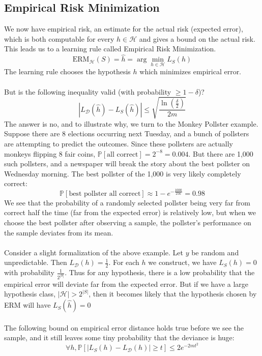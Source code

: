 \documentclass{article}
\newcommand{\p}{\mathbb{P}}
\newcommand{\D}{\mathcal{D}}
\newcommand{\h}{\mathcal{H}}
\begin{document}
\subsection{Empirical Risk Minimization}
  We now have empirical risk, an estimate for the actual risk (expected
  error), which is both computable for every $h \in \h$ and gives a bound on
  the actual risk. This leads us to a learning rule called Empirical Risk
  Minimization.
  $$\text{ERM}_\h(S) = \hat{h} = \arg \min_{h \in \h} L_S(h)$$
  The learning rule chooses the hypothesis $h$ which minimizes empirical error.
  \\
  \\But is the following inequality valid (with probability $\geq 1 - \delta$)?
  $$|L_\D(\hat{h}) - L_S(\hat{h})|\leq
  \sqrt{\frac{\ln \left(\frac{\delta}{2}\right)}{2m}}$$
  The answer is no, and to illustrate why, we turn to the Monkey Pollster
  example. Suppose there are 8 elections occurring next Tuesday, and a bunch of
  pollsters are attempting to predict the outcomes. Since these pollsters are
  actually monkeys flipping 8 fair coins, $\p[\text{all correct}] = 2^{-8}
  = 0.004$. But there are 1,000 such pollsters, and a newspaper will break the
  story about the best pollster on Wednesday morning. The best pollster of the
  1,000 is very likely completely correct:
  $$\p\left[\text{best pollster all correct}\right] \approx 1 -
  e^{- \frac{1000}{256}} = 0.98 $$
  We see that the probability of a randomly selected pollster being very far
  from
  correct half the time (far from the expected error) is relatively low, but
  when we choose the best pollster after observing a sample, the pollster's
  performance on the sample deviates from its mean.
  \\
  \\Consider a slight formalization of the above example. Let $y$ be random and
  unpredictable. Then $L_\D(h) = \frac{1}{2}$. For each $h$ we construct, we
  have $L_S(h) = 0$ with probability $\frac{1}{2^{|S|}}$. Thus for any
  hypothesis, there is a low probability that the empirical error will deviate
  far from the expected error. But if we have a large hypothesis class,
  $|\h|>2^{|S|}$, then it becomes likely that the hypothesis chosen by ERM
  will have $L_S(\hat{h})= 0$
  \\
  \\The following bound on empirical error distance holds true before we see the sample, and it still leaves some tiny probability that the deviance is huge:
  \begin{equation}\label{individualprobabilitybound}
    \forall h, \p\left[ | L_S(h) - L_\D(h)| \geq t \right] \leq
     2 e^{-2mt^2}
  \end{equation}
\end{document}
